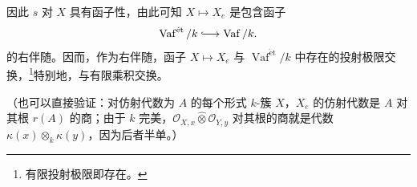 \begin{center}
  \label{sga3:VIIB:1.6.2:local-ring-square}
  
  \hspace{.07\textwidth}
  \label{sga3:VIIB:1.6.2:functoriality-square}
  
\end{center}

因此 \(s\) 对 \(X\) 具有函子性，由此可知 \(X\mapsto X_e\) 是包含函子 \[
  \operatorname{Vaf}^{\mathrm{\acute{e}t}}/k
  \lhook\joinrel\longrightarrow
  \operatorname{Vaf}/k.
\] 的右伴随。因而，作为右伴随，函子 \(X\mapsto X_e\) 与 \(\operatorname{Vaf}^{\mathrm{\acute{e}t}}/k\) 中存在的投射极限交换，\footnote{\label{sga3:VIIB:nde:75}有限投射极限即存在。}特别地，与有限乘积交换。

\noindent（也可以直接验证：对仿射代数为 \(A\) 的每个形式 \(k\)-簇 \(X\)，\(X_e\) 的仿射代数是 \(A\) 对其根 \(r(A)\) 的商；由于 \(k\) 完美，\(\mathcal O_{X,x}\widehat{\otimes}\mathcal O_{Y,y}\) 对其根的商就是代数 \(\kappa(x)\otimes_k\kappa(y)\)，因为后者半单。）


